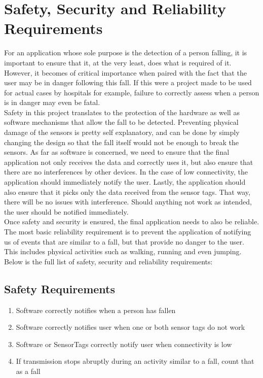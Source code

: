 \documentclass[conference,12pt]{IEEETran}
\begin{document}
\section{Safety, Security and Reliability Requirements}
	For an application whose sole purpose is the detection of a person falling, it is important to ensure that it, at the very least, does what is required of it. However, it becomes of critical importance when paired with the fact that the user may be in danger following this fall. If this were a project made to be used for actual cases by hospitals for example, failure to correctly assess when a person is in danger may even be fatal. 
	\\Safety in this project translates to the protection of the hardware as well as software mechanisms that allow the fall to be detected. Preventing physical damage of the sensors is pretty self explanatory, and can be done by simply changing the design so that the fall itself would not be enough to break the sensors. As far as software is concerned, we need to ensure that the final application not only receives the data and correctly uses it, but also ensure that there are no interferences by other devices. In the case of low connectivity, the application should immediately notify the user. Lastly, the application should also ensure that it picks only the data received from the sensor tags. That way, there will be no issues with interference. Should anything not work as intended, the user should be notified immediately.\\
	Once safety and security is ensured, the final application needs to also be reliable. The most basic reliability requirement is to prevent the application of notifying us of events that are similar to a fall, but that provide no danger to the user. This includes physical activities such as walking, running and even jumping. Below is the full list of safety, security and reliability requirements:

\subsection{Safety Requirements}

	\begin{enumerate}
		\item Software correctly notifies when a person has fallen
		\item Software correctly notifies user when one or both sensor tags do not work
		\item Software or SensorTags correctly notify user when connectivity is low
		\item If transmission stops abruptly during an activity similar to a fall, count that as a fall
	\end{enumerate}
\end{document}
